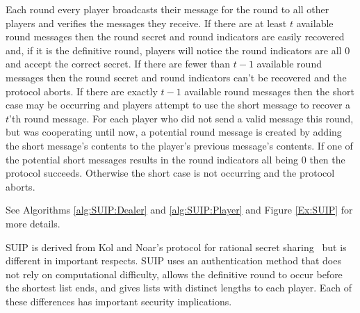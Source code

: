 \documentclass{dalcsthesis}
\begin{document}
Each round every player broadcasts their message for the round to all other players and verifies the messages they receive. If there are at least $t$ available round messages then the round secret and round indicators are easily recovered and, if it is the definitive round, players will notice the round indicators are all $0$ and accept the correct secret. If there are fewer than $t-1$ available round messages then the round secret and round indicators can't be recovered and the protocol aborts. If there are exactly $t-1$ available round messages then the short case may be occurring and players attempt to use the short message to recover a $t$'th round message. For each player who did not send a valid message this round, but was cooperating until now, a potential round message is created by adding the short message's contents to the player's previous message's contents. If one of the potential short messages results in the round indicators all being 0 then the protocol succeeds. Otherwise the short case is not occurring and the protocol aborts.

See Algorithms \ref{alg:SUIP:Dealer} and \ref{alg:SUIP:Player} and Figure \ref{Ex:SUIP} for more details.

SUIP is derived from Kol and Noar's protocol for rational secret sharing~\cite{kol08} but is different in important respects. SUIP uses an authentication method that does not rely on computational difficulty, allows the definitive round to occur before the shortest list ends, and gives lists with distinct lengths to each player. Each of these differences has important security implications.
\end{document}

